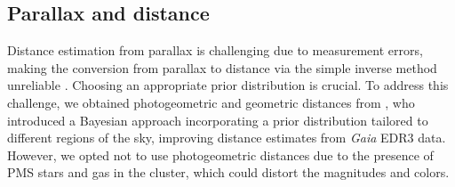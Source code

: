 \documentclass{aa}
\begin{document}
\subsection{Parallax and distance}\label{subsubsec:parallax}
Distance estimation from parallax is challenging due to measurement errors, making the conversion from parallax to distance via the simple inverse method unreliable \citep{2015PASP..127..994B,2021AJ....161..147B}. Choosing an appropriate prior distribution is crucial. To address this challenge, we obtained photogeometric and geometric distances from \citet{2021AJ....161..147B}, who introduced a Bayesian approach incorporating a prior distribution tailored to different regions of the sky, improving distance estimates from \textit{Gaia} EDR3 data. However, we opted not to use photogeometric distances due to the presence of PMS stars and gas in the cluster, which could distort the magnitudes and colors.
\end{document}
